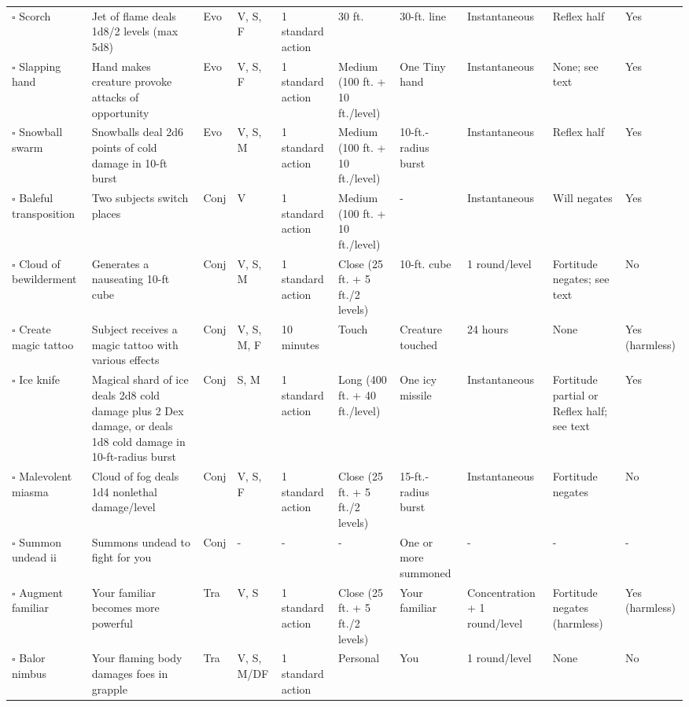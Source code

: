 \documentclass[12pt, a4paper]{article}
\begin{document}
\begin{center}
\begin{longtable}[H]{ p{8em} p{15em} p{2em} p{5em} p{6em} p{6em} p{10em} p{6em} p{5em} p{2em} }
    \(\square\) Scorch & Jet of ﬂame deals 1d8/2 levels (max 5d8) & Evo & V, S, F & 1 standard action & 30 ft. & 30-ft. line & Instantaneous & Reﬂex half & Yes\\
    \(\square\) Slapping hand & Hand makes creature provoke attacks of opportunity & Evo & V, S, F & 1 standard action & Medium (100 ft. + 10 ft./level) & One Tiny hand & Instantaneous & None; see text & Yes\\
    \(\square\) Snowball swarm & Snowballs deal 2d6 points of cold damage in 10-ft burst & Evo & V, S, M & 1 standard action & Medium (100 ft. + 10 ft./level) & 10-ft.-radius burst & Instantaneous & Reﬂex half & Yes\\
    \(\square\) Baleful transposition & Two subjects switch places & Conj & V & 1 standard action & Medium (100 ft. + 10 ft./level) & - & Instantaneous & Will negates & Yes\\
    \(\square\) Cloud of bewilderment & Generates a nauseating 10-ft cube & Conj & V, S, M & 1 standard action & Close (25 ft. + 5 ft./2 levels) & 10-ft. cube & 1 round/level & Fortitude negates; see text & No\\
    \(\square\) Create magic tattoo & Subject receives a magic tattoo with various effects & Conj & V, S, M, F & 10 minutes & Touch & Creature touched & 24 hours & None & Yes (harmless)\\
    \(\square\) Ice knife & Magical shard of ice deals 2d8 cold damage plus 2 Dex damage, or deals 1d8 cold damage in 10-ft-radius burst & Conj & S, M & 1 standard action & Long (400 ft. + 40 ft./level) & One icy missile & Instantaneous & Fortitude partial or Reﬂex half; see text & Yes\\
    \(\square\) Malevolent miasma & Cloud of fog deals 1d4 nonlethal damage/level & Conj & V, S, F & 1 standard action & Close (25 ft. + 5 ft./2 levels) & 15-ft.-radius burst & Instantaneous & Fortitude negates & No\\
    \(\square\) Summon undead ii & Summons undead to ﬁght for you & Conj & - & - & - & One or more summoned  & - & - & -\\
    \(\square\) Augment familiar & Your familiar becomes more powerful & Tra & V, S & 1 standard action & Close (25 ft. + 5 ft./2 levels) & Your familiar & Concentration + 1 round/level & Fortitude negates (harmless) & Yes (harmless)\\
    \(\square\) Balor nimbus & Your ﬂaming body damages foes in grapple & Tra & V, S, M/DF & 1 standard action & Personal & You & 1 round/level & None & No\\

\end{longtable}
\end{center}
\end{document}

